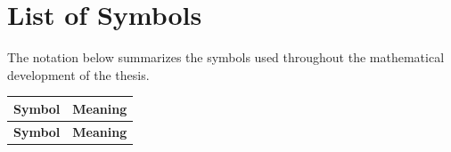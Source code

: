 \chapter*{List of Symbols}

The notation below summarizes the symbols used throughout the mathematical development of the thesis.

\begin{longtable}{@{}>{\raggedright\arraybackslash}p{} p{}@{}}
	\textbf{Symbol}                                    & \textbf{Meaning}                                                                                                                                                                                      \\
	\hline
	\endfirsthead
	\textbf{Symbol}                                    & \textbf{Meaning}                                                                                                                                                                                      \\
	\hline
	\endhead


\end{longtable}
